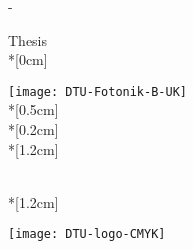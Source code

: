\thispagestyle{empty}             %
\calccentering{\unitlength}
\begin{adjustwidth*}{\unitlength}{-\unitlength}
    \begin{adjustwidth}{-0.5cm}{-0.5cm}
        \sffamily
        \begin{flushright}
            \thesistypeabbr{} Thesis\\*[0cm]
            \thesistype{}\\
        \end{flushright}
        \vspace*{\fill}
        \noindent
        \texttt{[image: DTU-Fotonik-B-UK]}\\*[0.5cm]
        \HUGE \thesistitle{}\\*[0.2cm]
        \Huge \thesissubtitle{}\\*[1.2cm]
        \parbox[b]{0.5\linewidth}{%
            \LARGE
            \thesisauthor{}\\*[1.2cm]
            \Large
            \thesislocation{} \the\year
        }
        \hfill\texttt{[image: DTU-logo-CMYK]}
    \end{adjustwidth}
\end{adjustwidth*}
\normalfont
\normalsize
